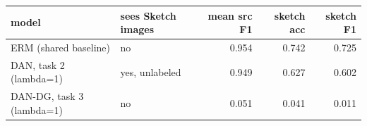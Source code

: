 \begin{tabular}{llrrr}
\toprule
model & sees Sketch images & mean src F1 & sketch acc & sketch F1 \\
\midrule
ERM (shared baseline) & no & 0.954 & 0.742 & 0.725 \\
DAN, task 2 (lambda=1) & yes, unlabeled & 0.949 & 0.627 & 0.602 \\
DAN-DG, task 3 (lambda=1) & no & 0.051 & 0.041 & 0.011 \\
\bottomrule
\end{tabular}
